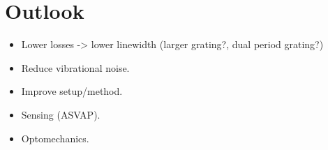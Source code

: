 \section{Outlook}

\begin{itemize}
    \item Lower losses -> lower linewidth (larger grating?, dual period grating?)
    \item Reduce vibrational noise. 
    \item Improve setup/method.
    \item Sensing (ASVAP).
    \item Optomechanics.
\end{itemize}

